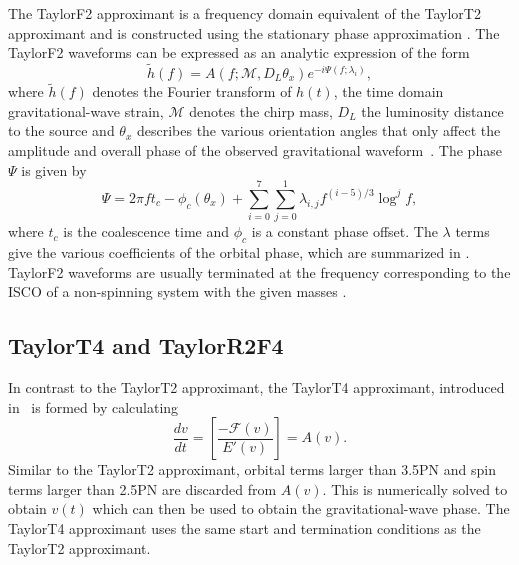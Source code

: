 The TaylorF2 approximant is a frequency domain equivalent of the TaylorT2
approximant and is constructed using the stationary phase approximation
\cite{Sathyaprakash:1991mt,Cutler:1994ys,Droz:1999qx,Blanchet:2006zz}.
The TaylorF2 waveforms can be expressed as an analytic expression of the form
%
\begin{equation}
 \tilde h(f) = A(f;\mathcal{M},D_L\theta_x) e^{ - i \Psi(f;\lambda_i)},
\end{equation}
%
where $\tilde h(f)$ denotes the Fourier transform of $h(t)$, the time domain
gravitational-wave strain, $\mathcal{M}$ denotes the chirp mass, $D_L$ the 
luminosity distance to the source and $\theta_x$ describes the various 
orientation angles that only affect the
amplitude and overall phase of the observed gravitational
waveform~\cite{Allen:2005fk}. The phase $\Psi$ is given by
%
\begin{equation} \label{eq:phase_exp}
\Psi = 2 \pi f t_c - \phi_c(\theta_x) + 
\sum_{i = 0}^{7} \sum_{j = 0}^{1} \lambda_{i, j} f^{(i-5)/3} \log^j f,
\end{equation}
%
where $t_c$ is the coalescence time and $\phi_c$ is a constant phase offset. The
$\lambda$ terms give the various coefficients of the orbital phase,
which are summarized in \cite{Arun:2008kb,Buonanno:2009zt}. TaylorF2 waveforms
are usually terminated at the frequency corresponding to the \ac{ISCO} of a
non-spinning system with the given masses \cite{Allen:2005fk}.

\subsection{TaylorT4 and TaylorR2F4}
\label{ssec:taylort4}

In contrast to the TaylorT2 approximant, the TaylorT4 approximant,
introduced in~\cite{Buonanno:2002fy} is formed by calculating
%
\begin{equation}\label{eq:t4}
\frac{dv}{dt} = \left[ \frac{-\mathcal{F}(v)}{E'(v)} \right] = 
A(v).
\end{equation}
%
Similar to the TaylorT2 approximant, orbital terms larger than 3.5\ac{PN} and
spin terms larger than 2.5\ac{PN} are discarded from $A(v)$. This is
numerically solved to obtain $v(t)$ which can then be used to obtain the
gravitational-wave phase. The TaylorT4 approximant uses the same start and
termination conditions as the TaylorT2 approximant.

